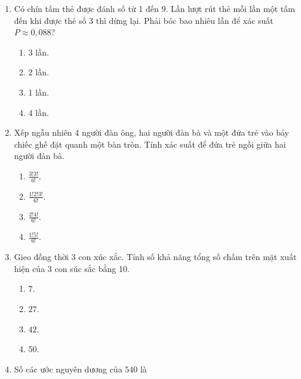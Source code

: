 \begin{enumerate}[label=\textbf{Câu \arabic*.},align=left,left=0cm..0cm,itemindent=*]
\begin{multicols}{4}
\begin{enumerate}[label=\textbf{\Alph*.},align=left,left=1cm..0cm,itemindent=*]
		\item $p^n$. \item $np$. \item $1-p^n$. \item $1-np$.
	\end{enumerate}\end{multicols}
	\item Có chín tấm thẻ được đánh số từ 1 đến 9. Lần lượt rút thẻ mỗi lần một tấm đến khi được thẻ số 3 thì dừng lại. Phải bóc bao nhiêu lần để xác suất $P\approx 0,088$?
	\begin{multicols}{4}\begin{enumerate}[label=\textbf{\Alph*.},align=left,left=1cm..0cm,itemindent=*]
		\item 3 lần. \item 2 lần. \item 1 lần. \item 4 lần.
	\end{enumerate}\end{multicols}
	\item Xếp ngẫu nhiên 4 người đàn ông, hai người đàn bà và một đứa trẻ vào bảy chiếc ghế đặt quanh một bàn tròn. Tính xác suất để đứa trẻ ngồi giữa hai người đàn bà.
	\begin{multicols}{4}\begin{enumerate}[label=\textbf{\Alph*.},align=left,left=1cm..0cm,itemindent=*]
		\item $\frac{3!3!}{6!}$. \item $\frac{1!2!3!}{6!}$. \item $\frac{2!4!}{6!}$. \item $\frac{1!5!}{6!}$.
	\end{enumerate}\end{multicols}
	\item Gieo đồng thời 3 con xúc xắc. Tính số khả năng tổng số chấm trên mặt xuất hiện của 3 con súc sắc bằng 10.
	\begin{multicols}{4}\begin{enumerate}[label=\textbf{\Alph*.},align=left,left=1cm..0cm,itemindent=*]
		\item $7$. \item $27$. \item $42$. \item $50$.
	\end{enumerate}\end{multicols}
	\item Số các ước nguyên dương của $540$ là
	\begin{multicols}{4}\begin{enumerate}[label=\textbf{\Alph*.},align=left,left=1cm..0cm,itemindent=*]

\end{enumerate}
\end{multicols}
\end{enumerate}
